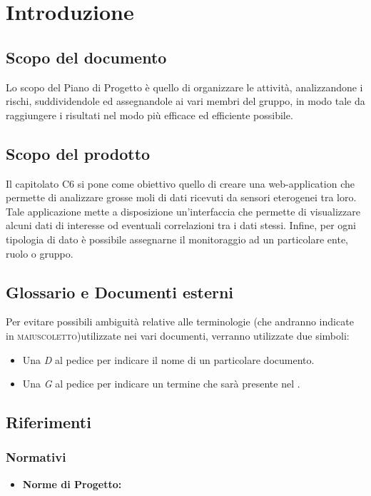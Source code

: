 \section{Introduzione}

	\subsection{Scopo del documento}
		Lo scopo del Piano di Progetto è quello di organizzare le attività, analizzandone i rischi, suddividendole ed assegnandole ai vari membri del gruppo, in modo tale da raggiungere i risultati nel modo più efficace ed efficiente possibile. 
	\subsection{Scopo del prodotto}
		Il capitolato C6 si pone come obiettivo quello di creare una web-application che permette di analizzare grosse moli di dati ricevuti da sensori eterogenei tra loro. Tale applicazione mette a disposizione un'interfaccia che permette di visualizzare alcuni dati di interesse od eventuali correlazioni tra i dati stessi. Infine, per ogni tipologia di dato è possibile assegnarne il monitoraggio ad un particolare ente, ruolo o gruppo.
	\subsection{Glossario e Documenti esterni}
		Per evitare possibili ambiguità relative alle terminologie (che andranno indicate in \textsc{maiuscoletto})utilizzate nei vari documenti, verranno utilizzate due simboli:
		\begin{itemize}
			\item Una \textit{D} al pedice per indicare il nome di un particolare documento.
			\item Una \textit{G} al pedice per indicare un termine che sarà presente nel .
		\end{itemize}
	\subsection{Riferimenti}
		\subsubsection{Normativi}
		\begin{itemize}
			\item \textbf{Norme di Progetto: } 
		\end{itemize}
			
